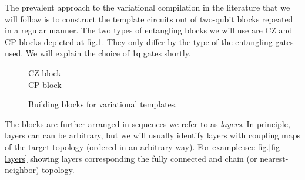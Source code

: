 \documentclass[twocolumn, amsfonts, amssymb, aps, nofootinbib]{revtex4-2}
\newcommand{\CZ}{CZ }
\newcommand{\CP}{CP }
\begin{document}
The prevalent approach to the variational compilation in the literature \cite{Khatri2019, Madden2021, Rakyta2021, Nakanishi2021, Rakyta2022} that we will follow is to construct the template circuits out of two-qubit blocks repeated in a regular manner. The two types of entangling blocks we will use are \CZ and \CP blocks depicted at fig.\ref{fig blocks}. They only differ by the type of the entangling gates used. We will explain the choice of 1q gates shortly.
\begin{figure}
\begin{flushleft}
\quad 	\CZ block
\\
\quad \CP block
\end{flushleft}
\caption{Building blocks for variational templates.  }
\label{fig blocks}
\end{figure}
The blocks are further arranged in sequences we refer to as \textit{layers}. In principle, layers can can be arbitrary, but we will usually identify layers with coupling maps of the target topology (ordered in an arbitrary way). For example see fig.\ref{fig layers} showing layers corresponding the fully connected and chain (or nearest-neighbor) topology.
\end{document}
